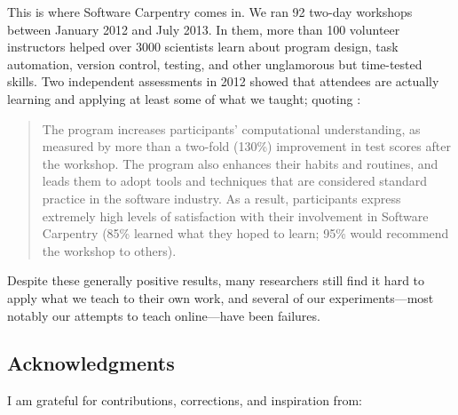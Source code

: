\documentclass{article}
\begin{document}
This is where Software Carpentry comes in. We ran 92 two-day workshops
between January 2012 and July 2013. In them, more than 100 volunteer
instructors helped over 3000 scientists learn about program design, task
automation, version control, testing, and other unglamorous but
time-tested skills. Two independent assessments in 2012 showed that
attendees are actually learning and applying at least some of what we
taught; quoting \cite{aranda2012}:

\begin{quote}
The program increases participants' computational understanding, as
measured by more than a two-fold (130\%) improvement in test scores
after the workshop. The program also enhances their habits and routines,
and leads them to adopt tools and techniques that are considered
standard practice in the software industry. As a result, participants
express extremely high levels of satisfaction with their involvement in
Software Carpentry (85\% learned what they hoped to learn; 95\% would
recommend the workshop to others).
\end{quote}

Despite these generally positive results, many researchers still find it
hard to apply what we teach to their own work, and several of our
experiments---most notably our attempts to teach online---have been
failures.

\subsection*{Acknowledgments}

I am grateful for contributions, corrections, and inspiration from:
\end{document}
